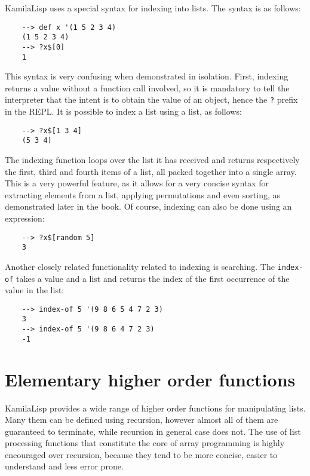 KamilaLisp uses a special syntax for indexing into lists. The syntax is as follows:

\begin{Verbatim}
    --> def x '(1 5 2 3 4)
    (1 5 2 3 4)
    --> ?x$[0]
    1
\end{Verbatim}

This syntax is very confusing when demonstrated in isolation. First, indexing returns a value without a function call involved, so it is mandatory to tell the interpreter that the intent is to obtain the value of an object, hence the \verb|?| prefix in the REPL. It is possible to index a list using a list, as follows:

\begin{Verbatim}
    --> ?x$[1 3 4]
    (5 3 4)
\end{Verbatim}

The indexing function loops over the list it has received and returns respectively the first, third and fourth items of a list, all packed together into a single array. This is a very powerful feature, as it allows for a very concise syntax for extracting elements from a list, applying permutations and even sorting, as demonstrated later in the book. Of course, indexing can also be done using an expression:

\begin{Verbatim}
    --> ?x$[random 5]
    3
\end{Verbatim}

Another closely related functionality related to indexing is searching. The \verb|index-of| takes a value and a list and returns the index of the first occurrence of the value in the list:

\begin{Verbatim}
    --> index-of 5 '(9 8 6 5 4 7 2 3)
    3
    --> index-of 5 '(9 8 6 4 7 2 3)
    -1
\end{Verbatim}

\section{Elementary higher order functions}

KamilaLisp provides a wide range of higher order functions for manipulating lists. Many them can be defined using recursion, however almost all of them are guaranteed to terminate, while recursion in general case does not. The use of list processing functions that constitute the core of array programming is highly encouraged over recursion, because they tend to be more concise, easier to understand and less error prone.

